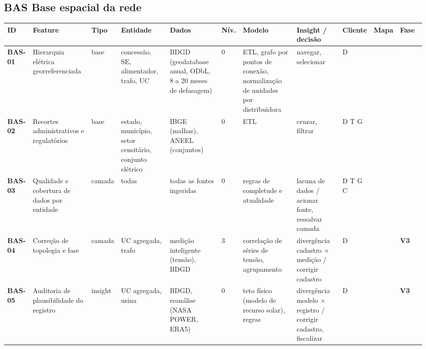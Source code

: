 \subsection*{BAS \textperiodcentered{} Base espacial da rede}
\label{cat:BAS}
{\footnotesize\setlength{\tabcolsep}{3pt}
\begin{longtable}{@{}P{1.35cm}P{4.1cm}P{1.3cm}P{3.1cm}P{3.7cm}C{0.6cm}P{3.6cm}P{3.3cm}P{1.1cm}P{0.9cm}P{1.1cm}@{}}
\toprule
\textbf{ID} & \textbf{Feature} & \textbf{Tipo} & \textbf{Entidade} & \textbf{Dados} & \textbf{Nív.} & \textbf{Modelo} & \textbf{Insight / decisão} & \textbf{Cliente} & \textbf{Mapa} & \textbf{Fase} \\
\midrule\endhead
\textbf{BAS-01} & Hierarquia elétrica georreferenciada & base & concessão, SE, alimentador, trafo, UC & BDGD (geodatabase anual, ODbL, 8 a 20 meses de defasagem) & 0 & ETL, grafo por pontos de conexão, normalização de unidades por distribuidora & navegar, selecionar & D &  & \colorbox{fMVP}{\scriptsize \textcolor{white}{\textbf{MVP}}} \\
\textbf{BAS-02} & Recortes administrativos e regulatórios & base & estado, município, setor censitário, conjunto elétrico & IBGE (malhas), ANEEL (conjuntos) & 0 & ETL & cruzar, filtrar & D T G &  & \colorbox{fMVP}{\scriptsize \textcolor{white}{\textbf{MVP}}} \\
\textbf{BAS-03} & Qualidade e cobertura de dados por entidade & camada & todas & todas as fontes ingeridas & 0 & regras de completude e atualidade & lacuna de dados / acionar fonte, ressalvar camada & D T G C &  & \colorbox{fMVP}{\scriptsize \textcolor{white}{\textbf{MVP}}} \\
\textbf{BAS-04} & Correção de topologia e fase & camada & UC agregada, trafo & medição inteligente (tensão), BDGD & 3 & correlação de séries de tensão, agrupamento & divergência cadastro $\times$ medição / corrigir cadastro & D &  & \colorbox{fV3}{\scriptsize \textbf{V3}} \\
\textbf{BAS-05} & Auditoria de plausibilidade do registro & insight & UC agregada, usina & BDGD, reanálise (NASA POWER, ERA5) & 0 & teto físico (modelo de recurso solar), regras & divergência modelo $\times$ registro / corrigir cadastro, fiscalizar & D &  & \colorbox{fV3}{\scriptsize \textbf{V3}} \\
\bottomrule
\end{longtable}}

